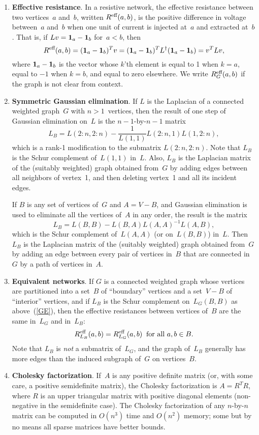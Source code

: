\documentclass[11pt]{article}
\newcommand{\m}[1]{{\bf{#1}}}       %
\newcommand{\ones}{\m1}             %
\newcommand{\Reff}{R^{\mbox{\scriptsize eff}}}  %
\newcommand{\pinv}{^{\dagger}}          %
\begin{document}
\begin{enumerate}
\item{\bf Effective resistance}.
In a resistive network, the effective resistance between
two vertices~$a$ and~$b$, written $\Reff(a,b)$, 
is the positive difference in voltage
between~$a$ and~$b$ when one unit of current is injected at~$a$
and extracted at~$b$.
That is, if $Lv=\ones_a-\ones_b$ for~$a<b$, then
$$\Reff(a,b) = (\ones_a-\ones_b)^Tv 
  = (\ones_a-\ones_b)^TL\pinv (\ones_a-\ones_b) = v^TLv,$$
where $\ones_a-\ones_b$
is the vector whose $k$'th element is equal to 1 when $k=a$, 
equal to $-1$ when $k=b$, and equal to zero elsewhere.
We write $\Reff_G(a,b)$ if the graph is not clear from context.

\item\label{GE}{\bf Symmetric Gaussian elimination}.
If $L$ is the Laplacian of a connected weighted graph~$G$ 
with $n>1$~vertices,
then the result of one step of Gaussian elimination on~$L$ is the
$n-1$-by-$n-1$ matrix
$$L_B = L(2:n, 2:n) - \frac{1}{L(1,1)}L(2:n,1)L(1,2:n),$$
which is a rank-1 modification to the submatrix $L(2:n, 2:n)$.
Note that $L_B$ is the Schur complement of~$L(1,1)$ in~$L$.
Also, $L_B$ is the Laplacian matrix of the (suitably weighted) 
graph obtained from~$G$
by adding edges between all neighbors of vertex~1,
and then deleting vertex~1 and all its incident edges.

If $B$ is any set of vertices of~$G$ and $A=V-B$, 
and Gaussian elimination is used to eliminate all the 
vertices of~$A$ in any order, the result is the matrix
$$L_B = L(B,B) - L(B,A)L(A,A)^{-1}L(A,B),$$
which is the Schur complement of~$L(A,A)$ (or on~$L(B,B)$) in~$L$.
Then $L_B$ is the Laplacian matrix of the (suitably weighted)
graph obtained from~$G$ by adding an edge between every pair 
of vertices in~$B$ that are connected in~$G$ by a path of 
vertices in~$A$.

\item{\bf Equivalent networks}.
If $G$ is a connected weighted graph whose vertices are
partitioned into a set~$B$ of ``boundary'' vertices and
a set~$V-B$ of ``interior'' vertices, 
and if $L_B$ is the Schur complement on~$L_G(B,B)$ 
as above~(\ref{GE}),
then the effective resistances between vertices of~$B$
are the same in~$L_G$ and in~$L_B$:
$$\Reff_{L_B}(a,b) = \Reff_{L_G}(a,b)\;\;\mbox{for all $a,b\in B$}.$$
Note that $L_B$ is {\em not} a submatrix of~$L_G$, 
and the graph of~$L_B$ generally has more edges than the induced 
subgraph of~$G$ on vertices~$B$.

\item\label{Cholesky}{\bf Cholesky factorization}.
If~$A$ is any positive definite matrix 
(or, with some care, a positive semidefinite matrix),
the Cholesky factorization is $A=R^TR$, where $R$
is an upper triangular matrix with positive diagonal elements
(non-negative in the semidefinite case).
The Cholesky factorization of any $n$-by-$n$ matrix can
be computed in $O(n^3)$ time and $O(n^2)$ memory;
some but by no means all sparse matrices have better
bounds.


\end{enumerate}
\end{document}
